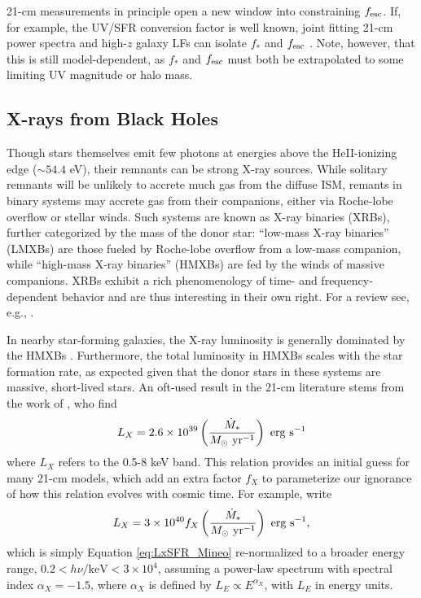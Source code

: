 21-cm measurements in principle open a new window into constraining $f_{\text{esc}}$. If, for example, the UV/SFR conversion factor is well known, joint fitting 21-cm power spectra and high-$z$ galaxy LFs can isolate $f_{\ast}$ and $f_{\text{esc}}$ \cite{Park2019,Greig2019}. Note, however, that this is still model-dependent, as $f_{\ast}$ and $f_{\text{esc}}$ must both be extrapolated to some limiting UV magnitude or halo mass. 


\subsection{X-rays from Black Holes}
Though stars themselves emit few photons at energies above the HeII-ionizing edge ($\sim 54.4$ eV), their remnants can be strong X-ray sources. While solitary remnants will be unlikely to accrete much gas from the diffuse ISM, remants in binary systems may accrete gas from their companions, either via Roche-lobe overflow or stellar winds. Such systems are known as X-ray binaries (XRBs), further categorized by the mass of the donor star: ``low-mass X-ray binaries'' (LMXBs) are those fueled by Roche-lobe overflow from a low-mass companion, while ``high-mass X-ray binaries'' (HMXBs) are fed by the winds of massive companions. XRBs exhibit a rich phenomenology of time- and frequency-dependent behavior and are thus interesting in their own right. For a review see, e.g., \cite{Remillard2006}.

In nearby star-forming galaxies, the X-ray luminosity is generally dominated by the HMXBs \cite{Gilfanov2004,Fabbiano2006,Mineo2012a}. Furthermore, the total luminosity in HMXBs scales with the star formation rate, as expected given that the donor stars in these systems are massive, short-lived stars. An oft-used result in the 21-cm literature stems from the work of \cite{Mineo2012a}, who find
\begin{equation}
	L_X = 2.6 \times 10^{39} \left(\frac{\SFR}{M_{\odot} \ \mathrm{yr}^{-1}} \right) \ \mathrm{erg} \ \mathrm{s}^{-1} \label{eq:LxSFR_Mineo}
\end{equation}
where $L_X$ refers to the 0.5-8 keV band. This relation provides an initial guess for many 21-cm models, which add an extra factor $f_X$ to parameterize our ignorance of how this relation evolves with cosmic time. For example, \cite{Furlanetto2006} write
\begin{equation}
	L_X = 3 \times 10^{40} f_X \left(\frac{\SFR}{M_{\odot} \ \mathrm{yr}^{-1}} \right) \ \mathrm{erg} \ \mathrm{s}^{-1} , \label{eq:LxSFR_Furlanetto}
\end{equation}
which is simply Equation \ref{eq:LxSFR_Mineo} re-normalized to a broader energy range, $0.2 < h\nu/\mathrm{keV} < 3\times 10^4$, assuming a power-law spectrum with spectral index $\alpha_X=-1.5$, where $\alpha_X$ is defined by $L_E \propto E^{\alpha_X}$, with $L_E$ in energy units. 


